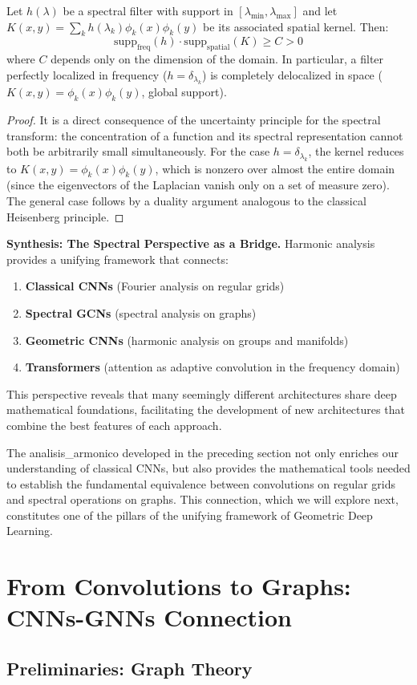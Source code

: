 \begin{proposition}\label{prop:tradeoff_localizacion}
Let $h(\lambda)$ be a spectral filter with support in $[\lambda_{\min}, \lambda_{\max}]$ and let $K(x,y) = \sum_k h(\lambda_k) \phi_k(x)\phi_k(y)$ be its associated spatial kernel. Then:
\begin{equation}
\text{supp}_{\text{freq}}(h) \cdot \text{supp}_{\text{spatial}}(K) \geq C > 0
\end{equation}
where $C$ depends only on the dimension of the domain. In particular, a filter perfectly localized in frequency ($h = \delta_{\lambda_k}$) is completely delocalized in space ($K(x,y) = \phi_k(x)\phi_k(y)$, global support).
\end{proposition}

\begin{proof}
It is a direct consequence of the uncertainty principle for the spectral transform: the concentration of a function and its spectral representation cannot both be arbitrarily small simultaneously. For the case $h = \delta_{\lambda_k}$, the kernel reduces to $K(x,y) = \phi_k(x)\phi_k(y)$, which is nonzero over almost the entire domain (since the eigenvectors of the Laplacian vanish only on a set of measure zero). The general case follows by a duality argument analogous to the classical Heisenberg principle.
\end{proof}

\textbf{Synthesis: The Spectral Perspective as a Bridge.} Harmonic analysis provides a unifying framework that connects:
\begin{enumerate}
    \item \textbf{Classical CNNs} (Fourier analysis on regular grids)
    \item \textbf{Spectral GCNs} (spectral analysis on graphs)
    \item \textbf{Geometric CNNs} (harmonic analysis on groups and manifolds)
    \item \textbf{Transformers} (attention as adaptive convolution in the frequency domain)
\end{enumerate}

This perspective reveals that many seemingly different architectures share deep mathematical foundations, facilitating the development of new architectures that combine the best features of each approach.

The \gls{analisis_armonico} developed in the preceding section not only enriches our understanding of classical CNNs, but also provides the mathematical tools needed to establish the fundamental equivalence between convolutions on regular grids and spectral operations on graphs. This connection, which we will explore next, constitutes one of the pillars of the unifying framework of Geometric Deep Learning.

\section[From Convolutions to Graphs: CNN-GNN Connection]{From Convolutions to Graphs: \glspl{CNN}-\glspl{GNN} Connection}\label{sec:cnn_as_gnn}

\subsection{Preliminaries: Graph Theory}\label{subsec:preliminares_grafos_cnn}
